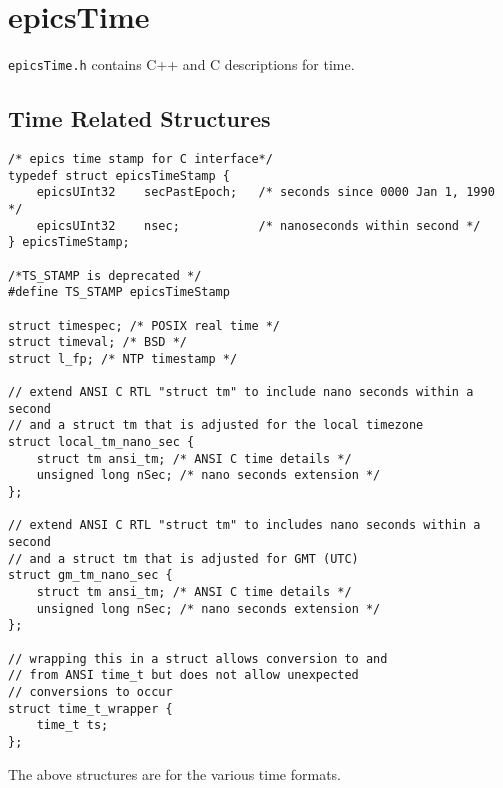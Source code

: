 \section{epicsTime}

\verb|epicsTime.h| contains C++ and C descriptions for time.

\subsection{Time Related Structures}

\begin{verbatim}
/* epics time stamp for C interface*/
typedef struct epicsTimeStamp {
    epicsUInt32    secPastEpoch;   /* seconds since 0000 Jan 1, 1990 */
    epicsUInt32    nsec;           /* nanoseconds within second */
} epicsTimeStamp;

/*TS_STAMP is deprecated */
#define TS_STAMP epicsTimeStamp

struct timespec; /* POSIX real time */
struct timeval; /* BSD */
struct l_fp; /* NTP timestamp */

// extend ANSI C RTL "struct tm" to include nano seconds within a second
// and a struct tm that is adjusted for the local timezone
struct local_tm_nano_sec {
    struct tm ansi_tm; /* ANSI C time details */
    unsigned long nSec; /* nano seconds extension */
};

// extend ANSI C RTL "struct tm" to includes nano seconds within a second
// and a struct tm that is adjusted for GMT (UTC)
struct gm_tm_nano_sec {
    struct tm ansi_tm; /* ANSI C time details */
    unsigned long nSec; /* nano seconds extension */
};

// wrapping this in a struct allows conversion to and
// from ANSI time_t but does not allow unexpected
// conversions to occur
struct time_t_wrapper {
    time_t ts;
};
\end{verbatim}


The above structures are for the various time formats.

